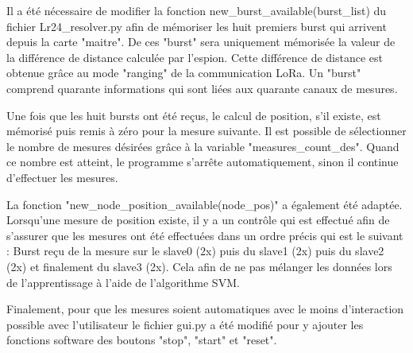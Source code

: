 Il a été nécessaire de modifier la fonction new\_burst\_available(burst\_list) du fichier Lr24\_resolver.py afin de mémoriser les huit premiers burst qui arrivent depuis la carte "maitre". De ces "burst" sera uniquement mémorisée la valeur de la différence de distance calculée par l'espion. Cette différence de distance est obtenue grâce au mode "ranging" de la communication LoRa. Un "burst" comprend quarante informations qui sont liées aux quarante canaux de mesures. 

Une fois que les huit bursts ont été reçus, le calcul de position, s’il existe, est mémorisé puis remis à zéro pour la mesure suivante. Il est possible de sélectionner le nombre de mesures désirées grâce à la variable "measures\_count\_des". Quand ce nombre est atteint, le programme s'arrête automatiquement, sinon il continue d'effectuer les mesures.

La fonction "new\_node\_position\_available(node\_pos)" a également été adaptée. Lorsqu'une mesure de position existe, il y a un contrôle qui est effectué afin de s'assurer que les mesures ont été effectuées dans un ordre précis qui est le suivant : Burst reçu de la mesure sur le slave0 (2x) puis du slave1 (2x) puis du slave2 (2x) et finalement du slave3 (2x). Cela afin de ne pas mélanger les données lors de l'apprentissage à l'aide de l'algorithme SVM. 

Finalement, pour que les mesures soient automatiques avec le moins d'interaction possible avec l'utilisateur le fichier gui.py a été modifié pour y ajouter les fonctions software des boutons "stop", "start" et "reset". 

